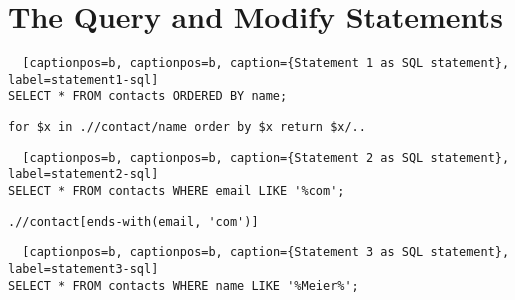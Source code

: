 \chapter{The Query and Modify Statements}
\label{app:the-query-and-modify-statements}
\begin{lstlisting} 	[captionpos=b, captionpos=b, caption={Statement 1 as SQL statement}, label=statement1-sql]
SELECT * FROM contacts ORDERED BY name;
\end{lstlisting} 

\begin{lstlisting}[captionpos=b, caption={Statement 1 as XQuery code}, label=statement1-xquery] 
for $x in .//contact/name order by $x return $x/..
\end{lstlisting} 

\begin{lstlisting} 	[captionpos=b, captionpos=b, caption={Statement 2 as SQL statement}, label=statement2-sql]
SELECT * FROM contacts WHERE email LIKE '%com';
\end{lstlisting} 

\begin{lstlisting}[captionpos=b, caption={Statement 2 as XQuery code}, label=statement2-xquery] 
.//contact[ends-with(email, 'com')]
\end{lstlisting} 

\begin{lstlisting} 	[captionpos=b, captionpos=b, caption={Statement 3 as SQL statement}, label=statement3-sql]
SELECT * FROM contacts WHERE name LIKE '%Meier%';
\end{lstlisting} 

